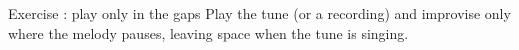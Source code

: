 \begin{study}{Exercise \theexercise: play only in the gaps}
Play the tune (or a recording) and improvise only where the melody pauses,
leaving space when the tune is singing.
\end{study}
